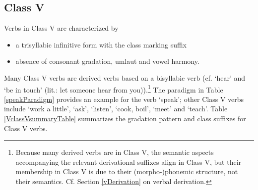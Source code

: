 \FloatBarrier

\subsection{Class V}\label{VclassV}
Verbs in Class V are characterized by 
\begin{itemize}
\item{a trisyllabic infinitive form with the class marking suffix }
\item{absence of consonant gradation, umlaut and vowel harmony.} 
\end{itemize}
Many Class V verbs are derived verbs based on a bisyllabic verb (cf.  ‘hear’ and  ‘be in touch’ (lit.: let someone hear from you)).\footnote{Because many derived verbs are in Class V, the semantic aspects accompanying the relevant derivational suffixes align in Class V, but their membership in Class V is due to their \mbox{(morpho-)phonemic} structure, not their semantics. Cf. Section \ref{vDerivation} on verbal derivation.} 
The paradigm in Table \vref{speakParadigm} provides an example for the verb  ‘speak’; 
other Class V verbs include  ‘work a little’,  ‘ask’,  ‘listen’,  ‘cook, boil’,  ‘meet’ and  ‘teach’. 
Table \vref{VclassVsummaryTable} summarizes the gradation pattern and class suffixes for Class V verbs. %

